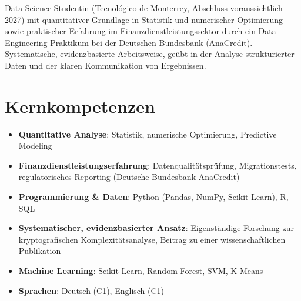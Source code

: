 \documentclass[11pt,a4paper,sans]{moderncv}
\begin{document}
\makecvtitle


\vspace{6pt}
\small{Data-Science-Studentin (Tecnológico de Monterrey, Abschluss voraussichtlich 2027) mit quantitativer Grundlage in Statistik und numerischer Optimierung sowie praktischer Erfahrung im Finanzdienstleistungssektor durch ein Data-Engineering-Praktikum bei der Deutschen Bundesbank (AnaCredit). Systematische, evidenzbasierte Arbeitsweise, geübt in der Analyse strukturierter Daten und der klaren Kommunikation von Ergebnissen.}


\section{Kernkompetenzen}
\vspace{1pt}
\begin{itemize}

\item \textbf{Quantitative Analyse}: Statistik, numerische Optimierung, Predictive Modeling

\item \textbf{Finanzdienstleistungserfahrung}: Datenqualitätsprüfung, Migrationstests, regulatorisches Reporting (Deutsche Bundesbank AnaCredit)

\item \textbf{Programmierung \& Daten}: Python (Pandas, NumPy, Scikit-Learn), R, SQL

\item \textbf{Systematischer, evidenzbasierter Ansatz}: Eigenständige Forschung zur kryptografischen Komplexitätsanalyse, Beitrag zu einer wissenschaftlichen Publikation

\item \textbf{Machine Learning}: Scikit-Learn, Random Forest, SVM, K-Means

\item \textbf{Sprachen}: Deutsch (C1), Englisch (C1)

\end{itemize}

\end{document}
